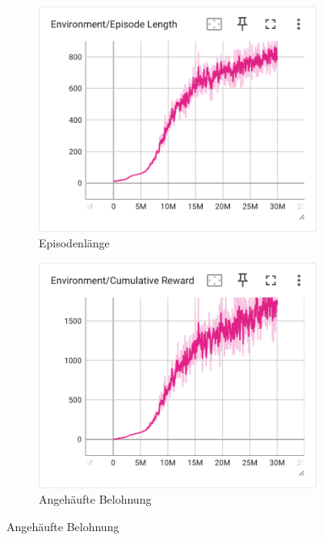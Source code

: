 \begin{figure}[H]
  \centering
    \begin{subfigure}{.49\textwidth}
      \centering  
      \includegraphics[width=\textwidth]{img/116_episode_length}
      \caption{Episodenlänge}
      \label{fig:116_episode_length}
    \end{subfigure}
    \begin{subfigure}{.49\textwidth}
      \centering  
      \includegraphics[width=\textwidth]{img/116_cumulative_reward}
      \caption{Angehäufte Belohnung}
      \label{fig:116_cumulative_reward}

\end{subfigure}
\end{figure}
